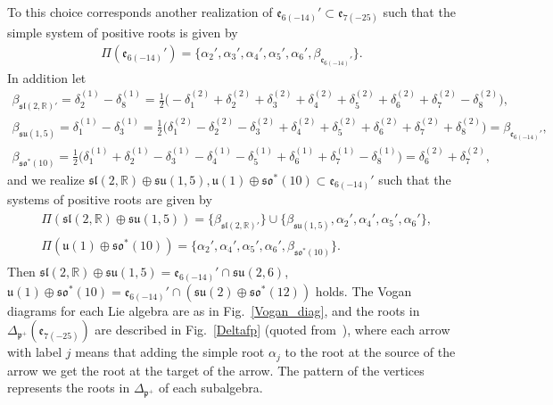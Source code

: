 \documentclass[pdftex]{sigma}
\numberwithin{equation}{section}
\newcommand{\BR}{\mathbb{R}}
\newcommand{\fp}{\mathfrak{p}}
\begin{document}
To this choice corresponds another realization of $\mathfrak{e}_{6(-14)}'\subset\mathfrak{e}_{7(-25)}$ such that
the simple system of positive roots is given by
\begin{gather*} \Pi(\mathfrak{e}_{6(-14)}')=\big\{\alpha_2',\alpha_3',\alpha_4',\alpha_5',\alpha_6',\beta_{\mathfrak{e}_{6(-14)}'}\big\}. \end{gather*}
In addition let
\begin{gather*}
\beta_{\mathfrak{sl}(2,\BR)'} =\delta_2^{(1)}-\delta_8^{(1)}
=\tfrac{1}{2}\big({-}\delta_1^{(2)}+\delta_2^{(2)}+\delta_3^{(2)}+\delta_4^{(2)}+\delta_5^{(2)}+\delta_6^{(2)}+\delta_7^{(2)}-\delta_8^{(2)}\big),\\
\beta_{\mathfrak{su}(1,5)} =\delta_1^{(1)}-\delta_3^{(1)}
=\tfrac{1}{2}\big(\delta_1^{(2)}-\delta_2^{(2)}-\delta_3^{(2)}+\delta_4^{(2)}+\delta_5^{(2)}+\delta_6^{(2)}+\delta_7^{(2)}+\delta_8^{(2)}\big)
=\beta_{\mathfrak{e}_{6(-14)}'},\\
\beta_{\mathfrak{so}^*(10)}
 =\tfrac{1}{2}\big(\delta_1^{(1)}+\delta_2^{(1)}-\delta_3^{(1)}-\delta_4^{(1)}-\delta_5^{(1)}+\delta_6^{(1)}+\delta_7^{(1)}-\delta_8^{(1)}\big)
=\delta_6^{(2)}+\delta_7^{(2)},
\end{gather*}
and we realize $\mathfrak{sl}(2,\BR)\oplus\mathfrak{su}(1,5),\mathfrak{u}(1)\oplus\mathfrak{so}^*(10)\subset\mathfrak{e}_{6(-14)}'$
such that the systems of positive roots are given by
\begin{gather*}\begin{split}&
\Pi(\mathfrak{sl}(2,\BR)\oplus\mathfrak{su}(1,5)) =\{\beta_{\mathfrak{sl}(2,\BR)'}\}
\cup\{\beta_{\mathfrak{su}(1,5)},\alpha_2',\alpha_4',\alpha_5',\alpha_6'\},\\
& \Pi(\mathfrak{u}(1)\oplus\mathfrak{so}^*(10))
 =\{\alpha_2',\alpha_4',\alpha_5',\alpha_6',\beta_{\mathfrak{so}^*(10)}\}.\end{split}
\end{gather*}
Then $\mathfrak{sl}(2,\BR)\oplus\mathfrak{su}(1,5)=\mathfrak{e}_{6(-14)}'\cap\mathfrak{su}(2,6)$, $\mathfrak{u}(1)\oplus\mathfrak{so}^*(10)=\mathfrak{e}_{6(-14)}'\cap(\mathfrak{su}(2)\oplus\mathfrak{so}^*(12))$ holds.
The Vogan diagrams for each Lie algebra are as in Fig.~\ref{Vogan_diag}, and the roots in $\Delta_{\fp^+}(\mathfrak{e}_{7(-25)})$ are described in Fig.~\ref{Deltafp} (quoted from~\cite[Appendix]{J}), where each arrow with label $j$ means that adding the simple root $\alpha_j$ to the root at the source of the arrow we get the root at the target of the arrow. The pattern of the vertices represents the roots in $\Delta_{\fp^+}$ of each subalgebra.
\end{document}
